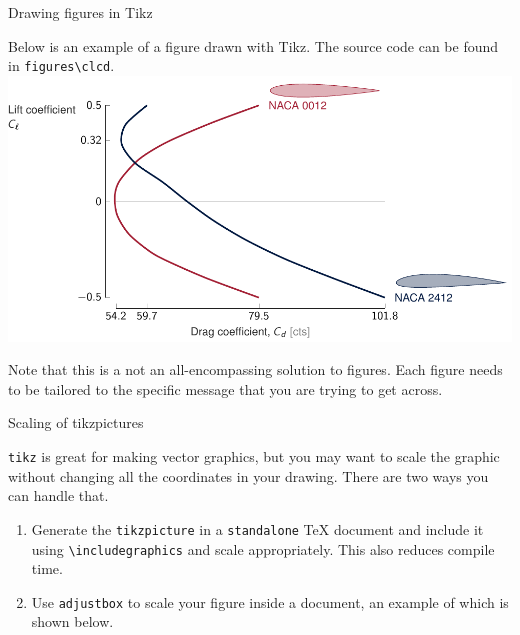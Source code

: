 \documentclass[unknownkeysallowed,aspectratio=43,10pt,onlymath]{beamer}
\begin{document}
\begin{frame}{Drawing figures in Tikz}

  Below is an example of a figure drawn with Tikz.
  The source code can be found in \texttt{figures\textbackslash clcd}.
  \includegraphics[width=\linewidth]{figures/clcd/clcd}

  Note that this is a not an all-encompassing solution to figures.
  Each figure needs to be tailored to the specific message that you are trying to get across.


\end{frame}

\begin{frame}{Scaling of tikzpictures}

\texttt{tikz} is great for making vector graphics, but you may want to scale the graphic without changing all the coordinates in your drawing. There are two ways you can handle that.
\begin{enumerate}
  \item Generate the \texttt{tikzpicture} in a \texttt{standalone} \TeX{} document and include it using \texttt{\textbackslash includegraphics} and scale appropriately. This also reduces compile time.
  \item Use \texttt{adjustbox} to scale your figure inside a document, an example of which is shown below.
\end{enumerate}

\begin{minipage}{0.485\textwidth}
  \centering
\end{minipage}\hfill
\begin{minipage}{0.485\textwidth}
  \centering
  \begin{adjustbox}{max width = 0.1\textwidth,max height = 0.1\textheight}
  \end{adjustbox}
\end{minipage}

\end{frame}
\end{document}
